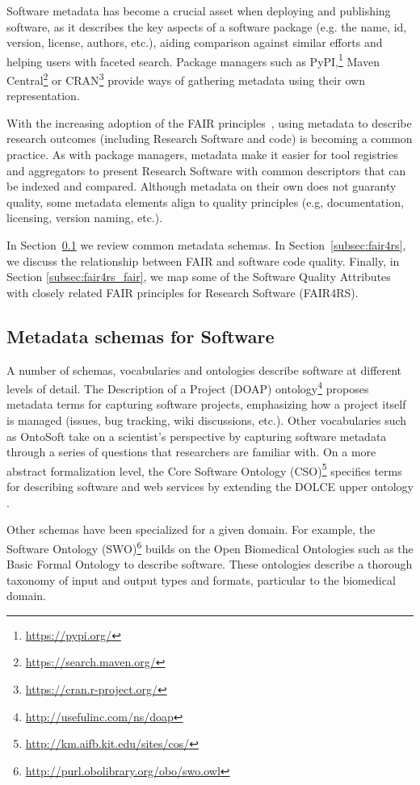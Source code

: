Software metadata has become a crucial asset when deploying and publishing software, as it describes the key aspects of a software package (e.g. the name, id, version, license, authors, etc.), aiding comparison against similar efforts and helping users with faceted search. Package managers such as PyPI,\footnote{\url{https://pypi.org/}} Maven Central\footnote{\url{https://search.maven.org/}} or CRAN\footnote{\url{https://cran.r-project.org/}} provide ways of gathering metadata using their own  representation.

With the increasing adoption of the FAIR principles~\cite{wilkinson_fair_2016}, using metadata to describe research outcomes (including Research Software and code) is becoming a common practice. As with package managers, metadata make it easier for tool registries and aggregators to present Research Software with common descriptors that can be indexed and compared. Although metadata on their own does not guaranty quality, some metadata elements align to quality principles (e.g, documentation, licensing, version naming, etc.).

In Section~\ref{subsec:schemas} we review common metadata schemas. In Section~\ref{subsec:fair4rs}, we discuss the relationship between FAIR and software code quality. Finally, in Section \ref{subsec:fair4rs_fair}, we map some of the Software Quality Attributes with closely related FAIR principles for Research Software (FAIR4RS).

\subsection{Metadata schemas for Software}
\label{subsec:schemas}

A number of schemas, vocabularies and ontologies describe software at different levels of detail. The Description of a Project (DOAP) ontology\footnote{\url{http://usefulinc.com/ns/doap}} proposes metadata terms for capturing software projects, emphasizing how a project itself is managed (issues, bug tracking, wiki discussions, etc.). Other vocabularies such as OntoSoft \cite{gil2016ontosoft} take on a scientist's perspective by capturing software metadata through a series of questions that researchers are familiar with. On a more abstract formalization level, the Core Software Ontology (CSO)\footnote{\url{http://km.aifb.kit.edu/sites/cos/}} specifies terms for describing software and web services by extending the DOLCE upper ontology \cite{gangemi2002sweetening}.

Other schemas have been specialized for a given domain. For example, the Software Ontology (SWO)\footnote{\url{http://purl.obolibrary.org/obo/swo.owl}} builds on the Open Biomedical Ontologies such as the Basic Formal Ontology \cite{spear2016functions} to describe software. These ontologies describe a thorough taxonomy of input and output types and formats, particular to the biomedical domain.

